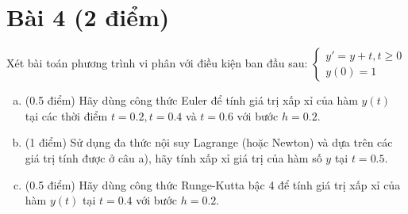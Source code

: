 \documentclass[11pt]{article}
\begin{document}
\section{Bài 4 (2 điểm)}

Xét bài toán phương trình vi phân với điều kiện ban đầu sau:
$
 \left\lbrace \begin{array}{l}
               y' = y+t, t \geq 0 \\
               y(0)=1
              \end{array}
\right.
$

\begin{enumerate}[a).]
\item (0.5 điểm) Hãy dùng công thức Euler để tính giá trị xấp xỉ của hàm $y(t)$ tại các thời điểm $t=0.2, t=0.4$ và $t=0.6$ với bước $h=0.2$.
\item (1 điểm) Sử dụng đa thức nội suy Lagrange (hoặc Newton) và dựa trên các giá trị tính được ở câu a), hãy tính xấp xỉ giá trị của hàm số $y$ tại $t=0.5$.
\item (0.5 điểm) Hãy dùng công thức Runge-Kutta bậc 4 để tính giá trị xấp xỉ của hàm $y(t)$ tại $t=0.4$ với bước $h=0.2$.
\end{enumerate}
\end{document}

